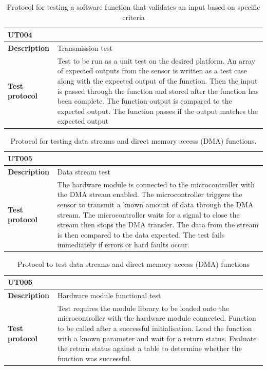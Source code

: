 \begin{table}[H]
	\centering
	\caption{Protocol for testing a software function that validates an input based on specific criteria}
	\setlength{\extrarowheight}{5pt}
	\label{tab:UT004}
	\begin{tabular}{m{} m{}}
		\multicolumn{2}{l}{\textbf{UT004} }\\
		\hline
		\textbf{Description} & Transmission test\\
		\hline
		\hline
		\textbf{Test protocol} & Test to be run as a unit test on the desired platform. An array of expected outputs from the sensor is written as a test case along with the expected output of the function. Then the input is passed through the function and stored after the function has been complete. The function output is compared to the expected output. The function passes if the output matches the expected output    \\
		\hline
		\hline
	\end{tabular}
\end{table}

\begin{table}[H]
	\centering
	\caption{ Protocol for testing data streams and direct memory access (DMA) functions.}
	\label{tab:UT005}
		\setlength{\extrarowheight}{5pt}
	\begin{tabular}{m{} m{}}
		\multicolumn{2}{l}{\textbf{UT005} }\\
		\hline
		\textbf{Description} & Data stream test\\
		\hline
		\hline
		\textbf{Test protocol} & The hardware module is connected to the microcontroller with the DMA stream enabled. The microcontroller triggers the sensor to transmit a known amount of data through the DMA stream. The microcontroller waits for a signal to close the stream then stops the DMA transfer. The data from the stream is then compared to the data expected. The test fails immediately if errors or hard faults occur.\\
		\hline
		\hline
	\end{tabular}
\end{table}

\begin{table}[H]
	\centering
	\caption{ Protocol to test data streams and direct memory access (DMA) functions}
	\label{tab:UT006}
	\setlength{\extrarowheight}{5pt}
	\begin{tabular}{m{} m{}}
		\multicolumn{2}{l}{\textbf{UT006} }\\
		\hline
		\textbf{Description} & Hardware module functional test\\
		\hline
		\hline
		\textbf{Test protocol} & Test requires the module library to be loaded onto the microcontroller with the hardware module connected. Function to be called after a successful initialisation. Load the function with a known parameter and wait for a return status. Evaluate the return status against a table to determine whether the function was successful. \\
		\hline
		\hline
	\end{tabular}
\end{table}

